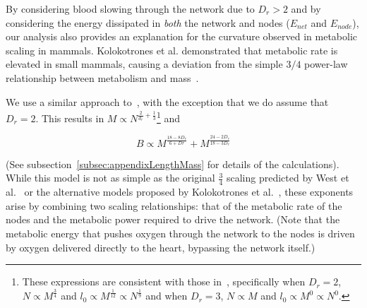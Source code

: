 \documentclass[12pt]{article}
\begin{document}
By considering blood slowing through the network due to $D_r > 2$ and by considering the energy dissipated in \emph{both} the network and 
nodes ($E_{net}$ and $E_{node}$), our analysis also provides an explanation for the curvature observed in
metabolic scaling in mammals. Kolokotrones et al.
demonstrated that metabolic rate is elevated in small mammals, causing a
deviation from the simple $3/4$ power-law relationship between metabolism and
mass~\cite{kolokotrones2010curvature}. 

We use a similar approach to~\cite{banavar10}, with the exception that we do
assume that $D_r=2$. This results in $M \propto N^{\frac{2}{d_r} +
\frac{1}{3}}$\footnote{These expressions are consistent with those
in~\cite{banavar10}, specifically when $D_r=2$, $N\propto M^{\frac{3}{4}}$ and
$l_0 \propto M^{\frac{1}{12}}\propto N^{\frac{1}{9}}$ and when $D_r=3$, $N\propto M$ and $l_0\propto M^0 \propto N^0$.} and

\begin{equation}
  \label{eq:OrganismPower}
  B \propto M^{\frac{18-8D_r}{6+Dr}} + M^{\frac{24-2D_r}{18-3D_r}} 
\end{equation}

\noindent (See subsection~\ref{subsec:appendixLengthMass} for details of the calculations).
While this model is not as simple as the original $\frac{3}{4}$
scaling predicted by West et al.~\cite{west97} or the alternative models
proposed by Kolokotrones et al.~\cite{kolokotrones2010curvature}, these exponents arise by combining two scaling relationships: that of the metabolic rate of the nodes and the metabolic power required to drive the network. (Note that the metabolic energy that pushes oxygen through the network to the nodes is driven by oxygen delivered directly to the heart, bypassing the network itself.)

\end{document}
